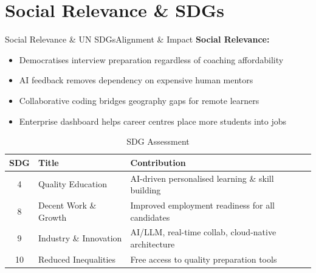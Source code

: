 \documentclass{beamer}
\begin{document}
\section{Social Relevance \& SDGs}
\begin{frame}{Social Relevance \& UN SDGs}{Alignment \& Impact}
\small
\textbf{Social Relevance:}
\begin{itemize}\setlength{\itemsep}{1pt}
    \item Democratises interview preparation regardless of coaching affordability
    \item AI feedback removes dependency on expensive human mentors
    \item Collaborative coding bridges geography gaps for remote learners
    \item Enterprise dashboard helps career centres place more students into jobs
\end{itemize}

\vspace{2pt}

\begin{table}
\centering
\scriptsize
\begin{tabular}{|c|l|p{5cm}|}
\hline
\textbf{SDG} & \textbf{Title} & \textbf{Contribution} \\ \hline
4 & Quality Education & AI-driven personalised learning \& skill building \\ \hline
8 & Decent Work \& Growth & Improved employment readiness for all candidates \\ \hline
9 & Industry \& Innovation & AI/LLM, real-time collab, cloud-native architecture \\ \hline
10 & Reduced Inequalities & Free access to quality preparation tools \\ \hline
\end{tabular}
\caption{SDG Assessment}
\end{table}
\end{frame}

\end{document}

